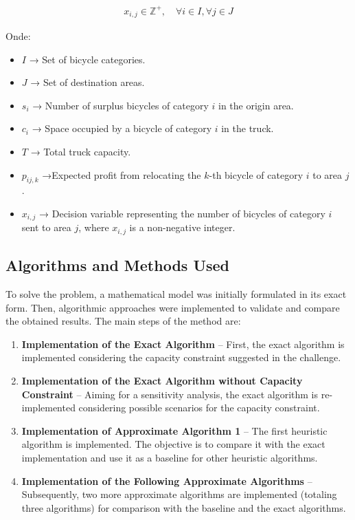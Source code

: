 \documentclass[]{article}
\begin{document}
\begin{align}
	x_{i,j} \in \mathbb{Z}^+,  \quad \forall i \in I, \forall j \in J
\end{align}

Onde:

\begin{itemize}
	\item $I$ → Set of bicycle categories.
	\item $J$ → Set of destination areas.
	\item $s_i$ → Number of surplus bicycles of category $i$ in the origin area.
	\item $c_i$ → Space occupied by a bicycle of category $i$ in the truck.
	\item $T$ → Total truck capacity.
	\item $p_{ij,k}$ →Expected profit from relocating the $k$-th bicycle of category $i$ to area $j$.
	\item $x_{i,j}$ → Decision variable representing the number of bicycles of category $i$ sent to area $j$, where $x_{i,j}$ is a non-negative integer.
\end{itemize}

\subsection{Algorithms and Methods Used}

To solve the problem, a mathematical model was initially formulated in its exact form. Then, algorithmic approaches were implemented to validate and compare the obtained results. The main steps of the method are:

\begin{enumerate}
	\item \textbf{Implementation of the Exact Algorithm} – First, the exact algorithm is implemented considering the capacity constraint suggested in the challenge.
	\item \textbf{Implementation of the Exact Algorithm without Capacity Constraint} – Aiming for a sensitivity analysis, the exact algorithm is re-implemented considering possible scenarios for the capacity constraint.
	\item \textbf{Implementation of Approximate Algorithm 1} – The first heuristic algorithm is implemented. The objective is to compare it with the exact implementation and use it as a baseline for other heuristic algorithms.
	\item \textbf{Implementation of the Following Approximate Algorithms} – Subsequently, two more approximate algorithms are implemented (totaling three algorithms) for comparison with the baseline and the exact algorithms.
\end{enumerate}
\end{document}
